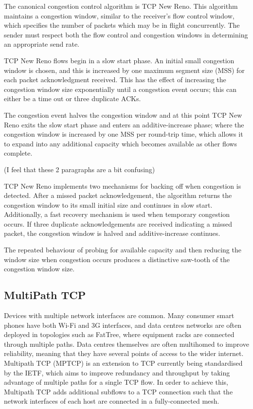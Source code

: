 The canonical congestion control algorithm is TCP New Reno. This algorithm
maintains a congestion window, similar to the receiver's flow control window,
which specifies the number of packets which may be in flight concurrently. The
sender must respect both the flow control and congestion windows in determining
an appropriate send rate.

TCP New Reno flows begin in a slow start phase. An initial small congestion
window is chosen, and this is increased by one maximum segment size (MSS) for
each packet acknowledgment received. This has the effect of increasing the
congestion window size exponentially until a congestion event occurs; this can
either be a time out or three duplicate ACKs. 

The congestion event halves the congestion window and at this point TCP New Reno
exits the slow start phase and enters an additive-increase phase; where the
congestion window is increased by one MSS per round-trip time, which allows it
to expand into any additional capacity which becomes available as other flows
complete.

(I feel that these 2 paragraphs are a bit confusing)

TCP New Reno implements two mechanisms for backing off when congestion is
detected. After a missed packet acknowledgement, the algorithm returns the
congestion window to its small initial size and continues in slow start.
Additionally, a fast recovery mechanism is used when temporary congestion
occurs. If three duplicate acknowledgements are received indicating a missed
packet, the congestion window is halved and additive-increase continues.

The repeated behaviour of probing for available capacity and then reducing the
window size when congestion occurs produces a distinctive saw-tooth of the
congestion window size.

\subsection{MultiPath TCP}
Devices with multiple network interfaces are common. Many consumer smart phones
have both Wi-Fi and 3G interfaces, and data centres networks are often deployed
in topologies such as FatTree, where equipment racks are connected through
multiple paths. Data centres themselves are often multihomed to improve
reliability, meaning that they have several points of access to the wider
internet. Multipath TCP (MPTCP) is an extension to TCP currently being
standardised by the IETF, which aims to improve redundancy and throughput by
taking advantage of multiple paths for a single TCP flow. In order to achieve
this, Multipath TCP adds additional subflows to a TCP connection such that the
network interfaces of each host are connected in a fully-connected mesh.

